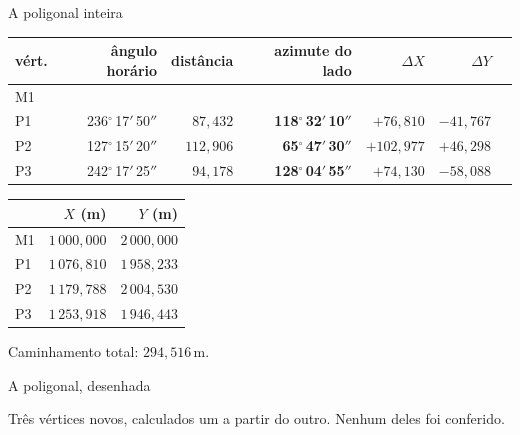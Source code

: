 \documentclass[aspectratio=169,11pt]{beamer}
\newcommand{\bnum}[1]{\textbf{\textcolor{mTeal}{#1}}}
\newcommand{\ang}[1]{\textcolor{corAng}{\textbf{#1}}}
\newcommand{\gr}[3]{#1\ensuremath{^\circ}\,#2\ensuremath{'}\,#3\ensuremath{''}}
\begin{document}
\begin{frame}{A poligonal inteira}
  \centering
  \footnotesize
  \renewcommand{\arraystretch}{1.2}
  \begin{tabular}{lrrrrrr}
    \toprule
    vért. & ângulo horário & distância & azimute do lado & $\Delta X$ & $\Delta Y$ & \\
    \midrule
    M1 & & & & & & \\
    P1 & \gr{236}{17}{50} & $87{,}432$ & \ang{\gr{118}{32}{10}} & $+76{,}810$ & $-41{,}767$ & \\
    P2 & \gr{127}{15}{20} & $112{,}906$ & \ang{\gr{65}{47}{30}} & $+102{,}977$ & $+46{,}298$ & \\
    P3 & \gr{242}{17}{25} & $94{,}178$ & \ang{\gr{128}{04}{55}} & $+74{,}130$ & $-58{,}088$ & \\
    \bottomrule
  \end{tabular}
  \medskip

  \renewcommand{\arraystretch}{1.15}
  \begin{tabular}{lrr}
    \toprule
    & $X$ (m) & $Y$ (m) \\
    \midrule
    M1 & $1\,000{,}000$ & $2\,000{,}000$ \\
    P1 & $1\,076{,}810$ & $1\,958{,}233$ \\
    P2 & $1\,179{,}788$ & $2\,004{,}530$ \\
    P3 & \bnum{$1\,253{,}918$} & \bnum{$1\,946{,}443$} \\
    \bottomrule
  \end{tabular}
  \smallskip

  {\footnotesize Caminhamento total: $294{,}516$\,m.}
\end{frame}

\begin{frame}{A poligonal, desenhada}
  \centering
  \bigskip

  Três vértices novos, calculados um a partir do outro. \alert{Nenhum deles foi conferido.}
\end{frame}
\end{document}
